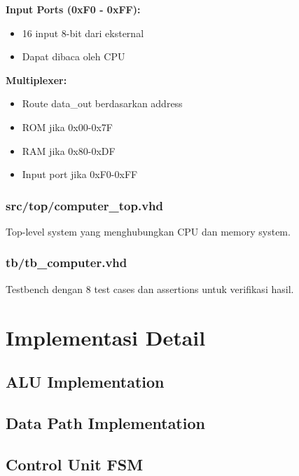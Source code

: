 \documentclass[12pt,a4paper]{report}
\begin{document}
\textbf{Input Ports (0xF0 - 0xFF):}
\begin{itemize}
  \item 16 input 8-bit dari eksternal
  \item Dapat dibaca oleh CPU
\end{itemize}

\textbf{Multiplexer:}
\begin{itemize}
  \item Route data\_out berdasarkan address
  \item ROM jika 0x00-0x7F
  \item RAM jika 0x80-0xDF
  \item Input port jika 0xF0-0xFF
\end{itemize}

\subsection{src/top/computer\_top.vhd}

Top-level system yang menghubungkan CPU dan memory system.

\subsection{tb/tb\_computer.vhd}

Testbench dengan 8 test cases dan assertions untuk verifikasi hasil.

\chapter{Implementasi Detail}

\section{ALU Implementation}



\section{Data Path Implementation}



\section{Control Unit FSM}
\end{document}

